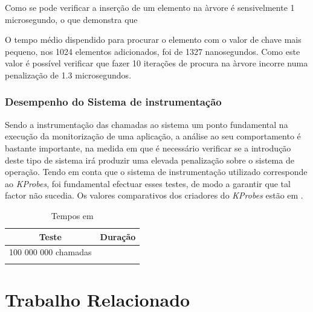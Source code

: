 \documentclass[a4paper]{llncs}
\begin{document}
Como se pode verificar a inserção de um elemento na àrvore é sensivelmente 1 microsegundo, o que demonstra que

O tempo médio dispendido para procurar o elemento com o valor de chave mais pequeno, nos 1024 elementos adicionados, foi de 1327 nanosegundos. Como este valor é possível verificar que fazer 10 iterações de procura na àrvore incorre numa penalização de 1.3 microsegundos.

\subsubsection{Desempenho do Sistema de instrumentação}
Sendo a instrumentação das chamadas ao sistema um ponto fundamental na execução da monitorização de uma aplicação, a análise ao seu comportamento é bastante importante, na medida em que é necessário verificar se a introdução deste tipo de sistema irá produzir uma elevada penalização sobre o sistema de operação. Tendo em conta que o sistema de instrumentação utilizado corresponde ao \textit{KProbes}, foi fundamental efectuar esses testes, de modo a garantir que tal factor não sucedia. Os valores comparativos dos criadores do \textit{KProbes} estão em \cite{KProbeKernel}.

\begin{table}
\begin{center}

\begin{tabular}{ | c | c |  }
\hline
Teste & \hspace{1cm}Duração\hspace{1cm} \\
\hline
100 000 000 chamadas & \\ 
\hline
 & \\
\hline

\hline
\end{tabular}
\caption{Tempos em }
\label{tab:kprobes_info}
\end{center}
\end{table}


\section{Trabalho Relacionado}
\label{sec:related_work}
\end{document}
